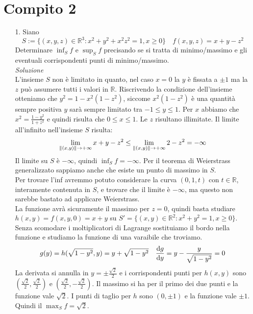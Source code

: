 \documentclass[a4paper]{article}
\begin{document}
\section*{Compito 2}
\begin{itemize}
\item[1.] Siano 
\begin{equation*}
S := \{ (x, y, z) \in \mathbb{R}^3 : x^2 + y^2 + x^2z^2 = 1, x\ge 0\} \quad f(x, y, z) =  x + y - z^2
\end{equation*}
Determinare $\inf_S f$ e $\sup_S f$ precisando se si tratta di minimo/massimo e gli eventuali corrispondenti punti di minimo/massimo.\\
\emph{Soluzione}\\
L'insieme $S$ non è limitato in quanto, nel caso $x = 0$ la $y$ è fissata a $\pm 1$ ma la $z$ può assumere tutti i valori in $\mathbb{R}$.
Riscrivendo la condizione dell'insieme otteniamo che $y^2 = 1-x^2 (1-z^2)$, siccome $x^2 (1-z^2)$ è una quantità sempre positiva $y$ sarà sempre limitato tra $-1 \le y \le 1$. Per $x$ abbiamo che $x^2 = \frac{1-y^2}{1+ z^2}$ e quindi risulta che $0 \le x \le 1$. Le $z$ risultano illimitate.
Il limite all'infinito nell'insieme $S$ risulta:
\begin{equation}
\lim\limits_{\norm{(x,y)} \rightarrow +\infty} x + y - z^2 \le \lim\limits_{\norm{(x,y)} \rightarrow +\infty} 2 - z^2 = - \infty 
\end{equation}
Il limite su $S$ è $- \infty$, quindi $\inf_{S} f = -\infty$. Per il teorema di Weierstrass generalizzato sappiamo anche che esiste un punto di massimo in $S$.\\
Per trovare l'inf avremmo potuto considerare la curva $(0, 1, t)$ con $t \in \mathbb{R}$, interamente contenuta in $S$, e trovare che il limite è $-\infty$, ma questo non sarebbe bastato ad applicare Weierstrass.\\
La funzione avrà sicuramente il massimo per $z=0$, quindi basta studiare $h(x,y)=f(x,y,0)=x+y$ su $S' = \{ (x,y) \in \mathbb{R}^2 : x^2 + y^2 =1, x\ge 0 \}$. Senza scomodare i moltiplicatori di Lagrange sostituiamo il bordo nella funzione e studiamo la funzione di una varaibile che troviamo.
\begin{equation}
g(y) = h(\sqrt{1-y^2}, y) = y + \sqrt{1-y^2} \quad \dv{g}{y} = y - \frac{y}{\sqrt{1-y^2}} = 0
\end{equation}
La derivata si annulla in $y = \pm \frac{\sqrt{2}}{2}$ e i corrispondenti punti per $h(x, y)$ sono $(\frac{\sqrt{2}}{2}, \frac{\sqrt{2}}{2})$ e $(\frac{\sqrt{2}}{2}, -\frac{\sqrt{2}}{2})$. Il massimo si ha per il primo dei due punti e la funzione vale $\sqrt{2}$. 
I punti di taglio per $h$ sono $(0, \pm 1)$ e la funzione vale $\pm 1$.
Quindi il $\max_{S} f = \sqrt{2}$.



\end{itemize}
\end{document}
